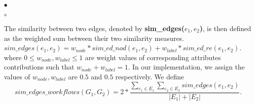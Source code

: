 \documentclass{new_tlp}
\begin{document}
{\begin{list}{$\bullet$}{\itemsep=0pt \parsep=1pt \topsep=1pt \leftmargin=10pt}
\begin{list}{$\circ$}{\itemsep=0pt \topsep=1pt \parsep=1pt \leftmargin=10pt}
			 
\end{list}
%
The similarity between two edges, denoted by \textbf{sim\_edges($e_{1},e_{2}$)}, is then defined as the weighted sum between their two similarity 
measures.
$sim\_edges(e_1,e_2) =  w_{node} * sim\_ed\_nod(e_{1},e_{2})  + w_{label}*sim\_ed\_re(e_1,e_2)$. 
where $0 \le w_{node}, w_{label}\le 1$ are weight values of corresponding attributes contributions such that 
$w_{node} + w_{label} = 1$. In our implementation, we assign the values of $w_{node}, w_{label}$ are $0.5$ and $0.5$ respectively.
We define $$sim\_edges\_workflows(G_1,G_2) = 2 * \frac{\sum_{e_1\in E_1} \sum_{e_2 \in E_2} sim\_edges(e_{1},e_{2})}{|E_1|+|E_2|}.$$
			                                              

\end{list}}
\end{document}
